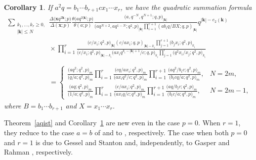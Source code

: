 \documentclass[pdftex]{sigma}%
\numberwithin{equation}{section}
\newtheorem{Corollary}[Theorem]{Corollary}
\newcommand\bk{\mathbf k}
\newcommand\bx{\mathbf x}
\begin{document}
\begin{Corollary}\label{aqisc}
If
$a^2q=b_1\dotsm b_{r+1}cx_1\dotsm x_r$,
we have the quadratic summation formula
\begin{gather*}
\sum_{\substack{k_1,\dots,k_r\geq 0,\\|\bk|\leq N}}
\frac{\Delta\big(\bx q^{2\bk};p\big)}{\Delta(\bx;p)}\frac{\theta\big(aq^{3|\bk|};p\big)}{\theta(a;p)}
\frac{\big(a,q^{-N},q^{N+1};q,p\big)_{|\bk|}}{\big(aq^{N+2},aq^{1-N};q^2,p\big)_{|\bk|}
\prod\limits_{i=1}^{r+1}(ab_iq/BX;q,p)_{|\bk|}} q^{|\bk|-e_2(\bk)}
\\ \phantom{\sum_{\substack{k_1,\dots,k_r\geq 0,\\|\bk|\leq N}}}{}
\times\prod\limits_{i=1}^r\frac{\big(c/x_i;q^2,p\big)_{|\bk|}(c/ax_i;q,p)_{|\bk|-k_i}
\prod\limits_{j=1}^{r+1}\big(b_jx_i;q^2,p\big)_{k_i}}{\big(c/x_i;q^2,p\big)_{|\bk|-k_i}
\big(ax_iq^{k_i-|\bk|+1}/c;q,p\big)_{k_i}\prod\limits_{j=1}^r\big(q^2x_i/x_j;q^2,p\big)_{k_i}}
\\ \phantom{\sum_{\substack{k_1,\dots,k_r\geq 0,\\|\bk|\leq N}}}{}
=\begin{cases}\displaystyle\frac{\big(aq^2;q^2,p\big)_m}{\big(q/a;q^2,p\big)_m}
\prod\limits_{i=1}^r\frac{\big(cq/ax_i;q^2,p\big)_m}{\big(ax_iq^2/c;q^2,p\big)_m}
\prod\limits_{i=1}^{r+1}\frac{\big(aq^{2}/b_ic;q^2,p\big)_m}{\big(b_icq/a;q^2,p\big)_m}, &N=2m,
\\[2.5ex]
\displaystyle\frac{\big(aq;q^2,p\big)_m}{\big(1/a;q^2,p\big)_m}\prod\limits_{i=1}^r
\frac{\big(c/ax_i;q^2,p\big)_m}{\big(ax_iq/c;q^2,p\big)_m}\prod\limits_{i=1}^{r+1}
\frac{\big(aq/b_ic;q^2,p\big)_m}{\big(b_ic/a;q^2,p\big)_m}, &N=2m-1,
\end{cases}
\end{gather*}
where $B=b_1\dotsm b_{r+1}$ and $X=x_1\dotsm x_r$.
\end{Corollary}

Theorem~\ref{aqist} and Corollary~\ref{aqisc} are new even in the case $p=0$. When $r=1$, they reduce to the case $a=b$ of \cite[Corollary~4.4]{w} and to \cite[Corollary~4.10]{w}, respectively.
The case when both $p=0$ and $r=1$ is due to Gessel and Stanton \cite{gs} and, independently, to Gasper and Rahman \cite{g,rh2}, respectively.
\end{document}
